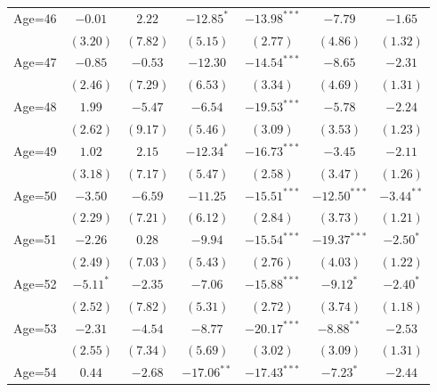\documentclass[fullpage]{paper}
\begin{document}
\begin{center}
\begin{longtable}{l c c c c c c }
Age=46      & $-0.01$       & $2.22$        & $-12.85^{*}$   & $-13.98^{***}$ & $-7.79$        & $-1.65$       \\
            & $(3.20)$      & $(7.82)$      & $(5.15)$       & $(2.77)$       & $(4.86)$       & $(1.32)$      \\
Age=47      & $-0.85$       & $-0.53$       & $-12.30$       & $-14.54^{***}$ & $-8.65$        & $-2.31$       \\
            & $(2.46)$      & $(7.29)$      & $(6.53)$       & $(3.34)$       & $(4.69)$       & $(1.31)$      \\
Age=48      & $1.99$        & $-5.47$       & $-6.54$        & $-19.53^{***}$ & $-5.78$        & $-2.24$       \\
            & $(2.62)$      & $(9.17)$      & $(5.46)$       & $(3.09)$       & $(3.53)$       & $(1.23)$      \\
Age=49      & $1.02$        & $2.15$        & $-12.34^{*}$   & $-16.73^{***}$ & $-3.45$        & $-2.11$       \\
            & $(3.18)$      & $(7.17)$      & $(5.47)$       & $(2.58)$       & $(3.47)$       & $(1.26)$      \\
Age=50      & $-3.50$       & $-6.59$       & $-11.25$       & $-15.51^{***}$ & $-12.50^{***}$ & $-3.44^{**}$  \\
            & $(2.29)$      & $(7.21)$      & $(6.12)$       & $(2.84)$       & $(3.73)$       & $(1.21)$      \\
Age=51      & $-2.26$       & $0.28$        & $-9.94$        & $-15.54^{***}$ & $-19.37^{***}$ & $-2.50^{*}$   \\
            & $(2.49)$      & $(7.03)$      & $(5.43)$       & $(2.76)$       & $(4.03)$       & $(1.22)$      \\
Age=52      & $-5.11^{*}$   & $-2.35$       & $-7.06$        & $-15.88^{***}$ & $-9.12^{*}$    & $-2.40^{*}$   \\
            & $(2.52)$      & $(7.82)$      & $(5.31)$       & $(2.72)$       & $(3.74)$       & $(1.18)$      \\
Age=53      & $-2.31$       & $-4.54$       & $-8.77$        & $-20.17^{***}$ & $-8.88^{**}$   & $-2.53$       \\
            & $(2.55)$      & $(7.34)$      & $(5.69)$       & $(3.02)$       & $(3.09)$       & $(1.31)$      \\
Age=54      & $0.44$        & $-2.68$       & $-17.06^{**}$  & $-17.43^{***}$ & $-7.23^{*}$    & $-2.44$       \\

\end{longtable}
\end{center}
\end{document}
